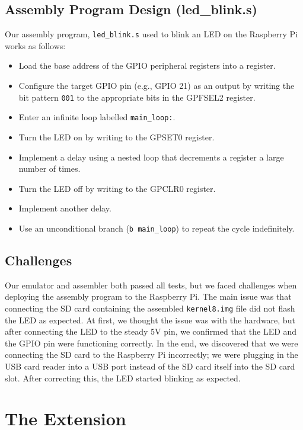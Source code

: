 \documentclass[11pt]{article}
\begin{document}
\subsection{Assembly Program Design (led\_blink.s)}
Our assembly program, \texttt{led\_blink.s} used to blink an LED on the Raspberry Pi works as follows:
\begin{itemize}
    \item Load the base address of the GPIO peripheral registers into a register.
    \item Configure the target GPIO pin (e.g., GPIO 21) as an output by writing the bit pattern \texttt{001} to the appropriate bits in the GPFSEL2 register.
    \item Enter an infinite loop labelled \texttt{main\_loop:}.
    \item Turn the LED on by writing to the GPSET0 register.
    \item Implement a delay using a nested loop that decrements a register a large number of times.
    \item Turn the LED off by writing to the GPCLR0 register.
    \item Implement another delay.
    \item Use an unconditional branch (\texttt{b main\_loop}) to repeat the cycle indefinitely.
\end{itemize}

\subsection{Challenges}
Our emulator and assembler both passed all tests, but we faced challenges when deploying the assembly program to the Raspberry Pi.
The main issue was that connecting the SD card containing the assembled 
\texttt{kernel8.img} file did not flash the LED as expected.
At first, we thought the issue was with the hardware, but after connecting the LED to the steady 5V pin, 
we confirmed that the LED and the GPIO pin were functioning correctly.
In the end, we discovered that we were connecting the SD card to the Raspberry Pi incorrectly;
we were plugging in the USB card reader into a USB port instead of the SD card itself into the SD card slot.
After correcting this, the LED started blinking as expected.


\section{The Extension}
\end{document}
